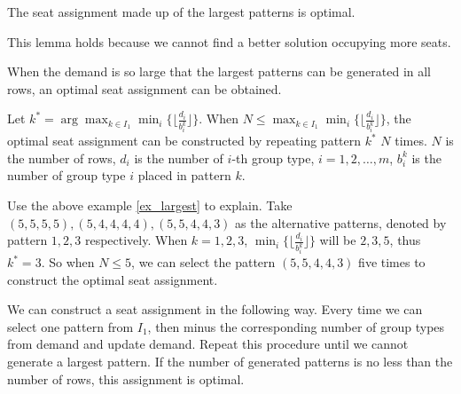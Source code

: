 \begin{lem}
The seat assignment made up of the largest patterns is optimal.
\end{lem}

This lemma holds because we cannot find a better solution occupying more seats.

When the demand is so large that the largest patterns can be generated in all rows, an optimal seat assignment can be obtained.

\begin{prop}\label{prop_I_1}
  Let $k^{*} = \arg \max_{k\in I_1} \min_{i} \{\lfloor \frac{d_i}{b_i^k}\rfloor\}$. 
  When $N \leq \max_{k\in I_1} \min_{i} \{\lfloor \frac{d_i}{b_i^k}\rfloor\}$, the optimal seat assignment can be constructed by repeating pattern $k^*$ $N$ times.
  $N$ is the number of rows, $d_i$ is the number of $i$-th group type, $i = 1,2,\ldots, m$, $b_i^k$ is the number of group type $i$ placed in pattern $k$.
\end{prop}

Use the above example \ref{ex_largest} to explain. Take $(5,5,5,5), (5,4,4,4,4), (5,5,4,4,3)$ as the alternative patterns, denoted by pattern $1, 2, 3$ respectively. When $k = 1,2,3$, $\min_{i} \{\lfloor \frac{d_i}{b_i^k}\rfloor\}$ will be $2,3,5$, thus $k^{*}= 3$. So when $N \leq 5$, we can select the pattern $(5,5,4,4,3)$ five times to construct the optimal seat assignment.

\begin{prop}\label{prop_I_2}
  We can construct a seat assignment in the following way. Every time we can select one pattern from $I_1$, then minus the corresponding number of group types from demand and update demand. Repeat this procedure until we cannot generate a largest pattern. If the number of generated patterns is no less than the number of rows, this assignment is optimal.
\end{prop}


\newpage
